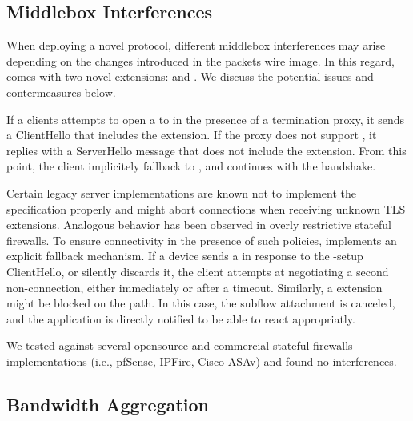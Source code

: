 \subsection{Middlebox Interferences}

When deploying a novel protocol, different middlebox interferences may arise
depending on the changes introduced in the packets wire image. In this
regard, \tcpls comes with two novel \tls extensions: \tcpls and \join.
We discuss the potential issues and contermeasures below.

If a clients attempts to open a \tcpls to in the presence of a \tls termination
proxy, it sends a ClientHello that includes the \tcpls extension. If the proxy
does not support \tcpls, it replies with a ServerHello message that does not
include the \tcpls extension. From this point, the client implicitely fallback
to \tls, and continues with the handshake.

Certain legacy \tls server implementations are known not to implement the \tls
specification properly and might abort connections when receiving unknown TLS
extensions. Analogous behavior has been observed in overly restrictive stateful
firewalls.  To ensure connectivity in the presence of such policies, \tcpls
implements an explicit fallback mechanism. If a device sends a \tcp \rst in
response to the \tcpls-setup ClientHello, or silently discards it, the client
attempts at negotiating a second non-\tcpls \tls connection, either immediately
or after a timeout. Similarly, a \tcpls \join extension might be blocked on the
path. In this case, the subflow attachment is canceled, and the application
is directly notified to be able to react appropriatly.

We tested \tcpls against several opensource and commercial stateful firewalls
implementations (i.e., pfSense, IPFire, Cisco ASAv) and found no interferences.

\subsection{Bandwidth Aggregation}

